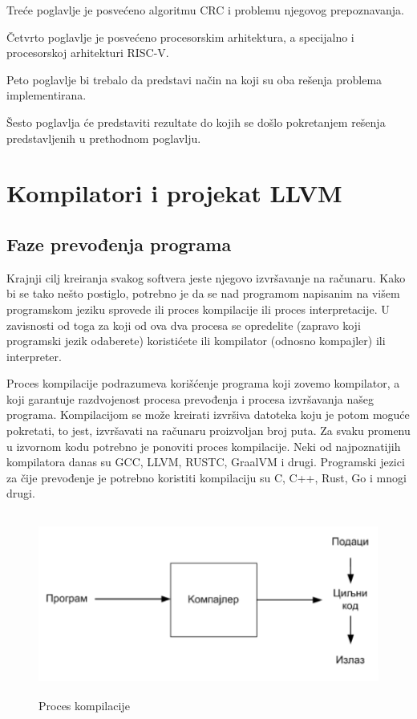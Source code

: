 \documentclass[12pt,oneside]{memoir}
\begin{document}
Treće poglavlje je posvećeno algoritmu CRC i problemu njegovog prepoznavanja. 

Četvrto poglavlje je posvećeno procesorskim arhitektura, a specijalno i procesorskoj arhitekturi RISC-V.

Peto poglavlje bi trebalo da predstavi način na koji su oba rešenja problema implementirana.

Šesto poglavlja će predstaviti rezultate do kojih se došlo pokretanjem rešenja predstavljenih u prethodnom poglavlju.
\chapter{Kompilatori i projekat LLVM}
\section{Faze prevođenja programa}
Krajnji cilj kreiranja svakog softvera jeste njegovo izvršavanje na računaru. 
Kako bi se tako nešto postiglo, potrebno je da se nad programom napisanim na 
višem programskom jeziku sprovede ili proces kompilacije ili proces 
interpretacije. U zavisnosti od toga za koji od ova dva procesa se opredelite 
(zapravo koji programski jezik odaberete) koristićete ili 
kompilator (odnosno kompajler) ili interpreter.

Proces kompilacije podrazumeva korišćenje programa koji zovemo kompilator, a 
koji garantuje razdvojenost procesa prevođenja i procesa izvršavanja našeg 
programa. Kompilacijom se može kreirati izvršiva datoteka koju je potom moguće pokretati, to 
jest, izvršavati na računaru proizvoljan broj puta. Za svaku promenu u izvornom kodu potrebno je 
ponoviti proces kompilacije. Neki od najpoznatijih kompilatora danas su GCC, LLVM, RUSTC, GraalVM 
i drugi. Programski jezici za čije prevođenje je potrebno koristiti kompilaciju su C, C++, Rust, 
Go i mnogi drugi.

\begin{figure}
\includegraphics[width=\textwidth, height=6cm]{kompilacija}
\caption{Proces kompilacije}
\centering
\end{figure}
\end{document}
